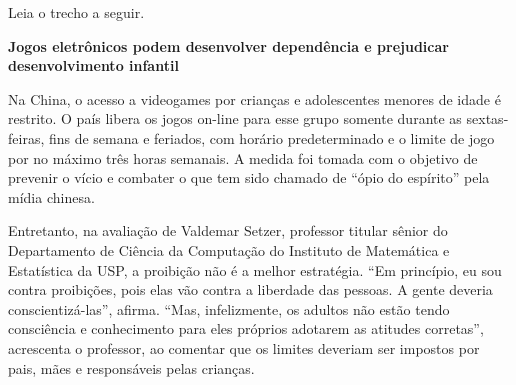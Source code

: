 
Leia o trecho a seguir.

\begin{myquote}
\begin{center}
\textbf{Jogos eletrônicos podem desenvolver dependência e prejudicar
desenvolvimento infantil}\\
\end{center}

\medskip


\noindent Na China, o acesso a videogames por crianças e adolescentes menores de
idade é restrito. O país libera os jogos on-line para esse grupo somente
durante as sextas-feiras, fins de semana e feriados, com horário
predeterminado e o limite de jogo por no máximo três horas semanais. A
medida foi tomada com o objetivo de prevenir o vício e combater o que
tem sido chamado de ``ópio do espírito'' pela mídia chinesa.

Entretanto, na avaliação de Valdemar Setzer, professor titular sênior do
Departamento de Ciência da Computação do Instituto de Matemática e
Estatística da USP, a proibição não é a melhor estratégia. ``Em
princípio, eu sou contra proibições, pois elas vão contra a liberdade
das pessoas. A gente deveria conscientizá-las'', afirma. ``Mas,
infelizmente, os adultos não estão tendo consciência e conhecimento para
eles próprios adotarem as atitudes corretas'', acrescenta o professor,
ao comentar que os limites deveriam ser impostos por pais, mães e
responsáveis pelas crianças.

\end{myquote}

